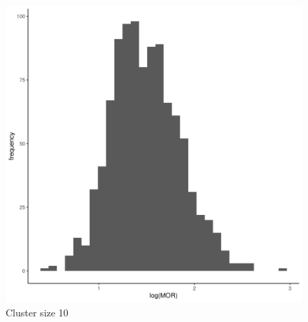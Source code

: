 \documentclass[
  letterpaper,
  DIV=11,
  numbers=noendperiod,
  titlepage]{scrartcl}
\begin{document}
\begin{figure}
\begin{minipage}[t]{0.24\linewidth}
{{\includegraphics{../../plots/two-lvl-ran-int/high-prev/hist_30_10_two_lvl_high_prev.png}

}

\caption{Cluster size 10}

}

\end{minipage}%
%
\begin{minipage}[t]{0.24\linewidth}

{\centering 

}
\end{minipage}
\end{figure}
\end{document}
